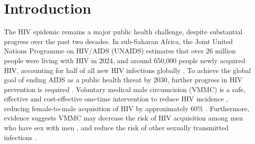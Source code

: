 \documentclass{article}
\begin{document}
\begin{abstract}
  \noindent \textbf{Background} \\

  \noindent \textbf{Methods} \\

  \noindent \textbf{Results} \\

  \noindent \textbf{Conclusions} \\

\end{abstract}
\newpage


\section*{Introduction}


The HIV epidemic remains a major public health challenge, despite substantial progress over the past two decades. In sub-Saharan Africa, the Joint United Nations Programme on HIV/AIDS (UNAIDS) estimates that over 26 million people were living with HIV in 2024, and around 650,000 people newly acquired HIV, accounting for half of all new HIV infections globally \cite{UNAIDS2025}. To achieve the global goal of ending AIDS as a public health threat by 2030, further progress in HIV prevention is required \cite{UNAIDSStrategy}. Voluntary medical male circumcision (VMMC) is a safe, effective and cost-effective one-time intervention to reduce HIV incidence \cite{bansi2023cost}, reducing female-to-male acquisition of HIV by approximately 60\% \cite{gray2007male, bailey2007male, auvert2005randomized, gray2012effectiveness}. Furthermore, evidence suggests VMMC may decrease the risk of HIV acquisition among men who have sex with men \cite{yuan2019circumcision}, and reduce the risk of other sexually transmitted infections \cite{tobian2009male, grund2017association}. 
\end{document}
